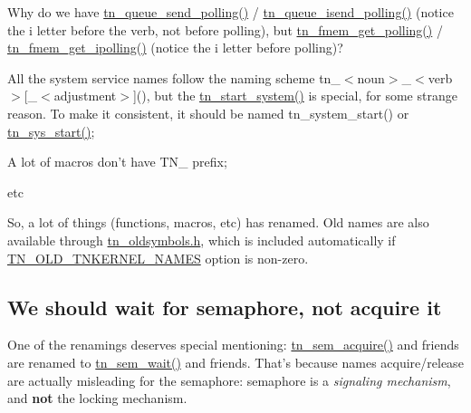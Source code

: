 \begin{DoxyItemize}
\item Why do we have {\ttfamily \hyperlink{tn__dqueue_8h_af60c61c12ed90f4bcc7d13ca4da8562b}{tn\+\_\+queue\+\_\+send\+\_\+polling()}} / {\ttfamily \hyperlink{tn__dqueue_8h_ac059f15f07625ca25e4aac5790cce1ea}{tn\+\_\+queue\+\_\+isend\+\_\+polling()}} (notice the {\ttfamily i} letter before the verb, not before {\ttfamily polling}), but {\ttfamily \hyperlink{tn__fmem_8h_affea42ad41734fadfe8170b4234ca567}{tn\+\_\+fmem\+\_\+get\+\_\+polling()}} / {\ttfamily \hyperlink{tn__oldsymbols_8h_a4293c359514306825a9007f071b2ad3f}{tn\+\_\+fmem\+\_\+get\+\_\+ipolling()}} (notice the {\ttfamily i} letter before {\ttfamily polling})?
\item All the system service names follow the naming scheme {\ttfamily tn\+\_\+$<$noun$>$\+\_\+$<$verb$>$\mbox{[}\+\_\+$<$adjustment$>$\mbox{]}()}, but the {\ttfamily \hyperlink{tn__oldsymbols_8h_a566625be14a6eed4a3574e3d31e776fc}{tn\+\_\+start\+\_\+system()}} is special, for some strange reason. To make it consistent, it should be named {\ttfamily tn\+\_\+system\+\_\+start()} or {\ttfamily \hyperlink{tn__sys_8h_a62ab25d9d8ca01c02d368968f19e49bf}{tn\+\_\+sys\+\_\+start()}};
\item A lot of macros don't have {\ttfamily T\+N\+\_\+} prefix;
\item etc
\end{DoxyItemize}

So, a lot of things (functions, macros, etc) has renamed. Old names are also available through {\ttfamily \hyperlink{tn__oldsymbols_8h}{tn\+\_\+oldsymbols.\+h}}, which is included automatically if {\ttfamily \hyperlink{tn__cfg__default_8h_ae9854c723c6a823c9126aa8390977d39}{T\+N\+\_\+\+O\+L\+D\+\_\+\+T\+N\+K\+E\+R\+N\+E\+L\+\_\+\+N\+A\+M\+E\+S}} option is non-\/zero.\hypertarget{tnkernel_diff_tnkernel_diff_api_rename_sem}{}\subsection{We should wait for semaphore, not acquire it}\label{tnkernel_diff_tnkernel_diff_api_rename_sem}
One of the renamings deserves special mentioning\+: {\ttfamily \hyperlink{tn__oldsymbols_8h_abdc5c428590ff525cdb566da613015ce}{tn\+\_\+sem\+\_\+acquire()}} and friends are renamed to {\ttfamily \hyperlink{tn__sem_8h_a6bf88a78f4f8b2799f72ee671b52ed97}{tn\+\_\+sem\+\_\+wait()}} and friends. That's because names acquire/release are actually misleading for the semaphore\+: semaphore is a {\itshape signaling mechanism}, and {\bfseries not} the locking mechanism.

